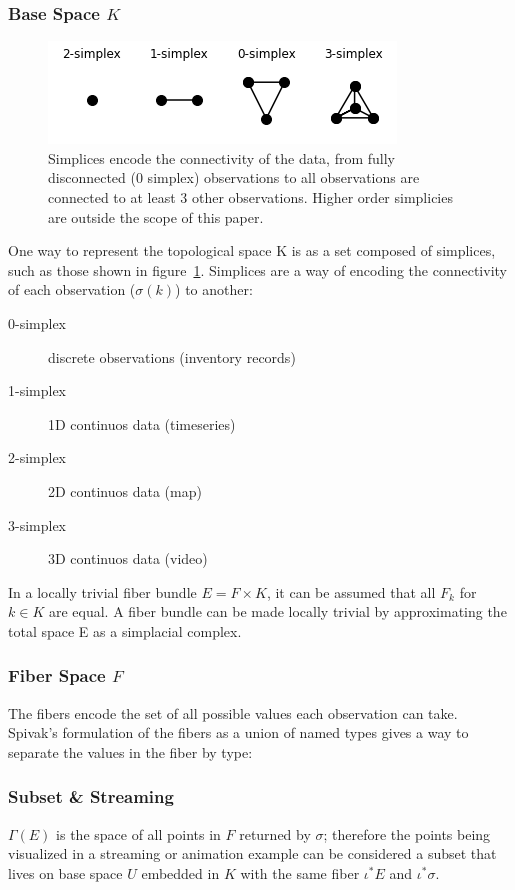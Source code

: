 \documentclass[../intro.tex]{subfiles}
\begin{document}
\subsubsection{Base Space $K$}

\begin{figure}[ht]
    \label{fig:simplex}
    \includegraphics{figures/sections/math/simplex.png}
    \caption{Simplices encode the connectivity of the data, from fully disconnected (0 simplex) observations to all observations are connected to at least 3 other observations. Higher order simplicies are outside the scope of this paper.}
\end{figure}

One way to represent the topological space K is as a set composed of simplices, such as those shown in figure~\ref{fig:simplex}. Simplices are a way of encoding the connectivity of each observation ($\sigma(k)$) to another:

\begin{description}
    \item[0-simplex] discrete observations (inventory records)
    \item[1-simplex] 1D continuos data (timeseries)
    \item[2-simplex] 2D continuos data (map)
    \item[3-simplex] 3D continuos data (video)
\end{description}

In a locally trivial fiber bundle $E = F \times K$, it can be assumed that all $F_{k}$ for $k \in K$ are equal. A fiber bundle can be made locally trivial by approximating the total space E as a simplacial complex.

\subsubsection{Fiber Space $F$}
The fibers encode the set of all possible values each observation can take. 
Spivak's \cite{spivakSIMPLICIALDATABASES} formulation of the fibers as a union of named types gives a way to separate the values in the fiber by type:

\subsubsection{Subset \& Streaming}
$\Gamma(E)$ is the space of all points in $F$ returned by $\sigma$; therefore the points being visualized in a streaming or animation example can be considered a subset that lives on base space $U$ embedded in $K$ with the same fiber $\iota^*E$ and $\iota^*\sigma$.   
\end{document}
